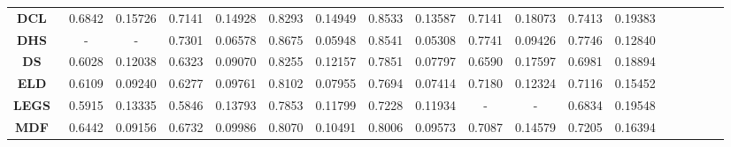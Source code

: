 \documentclass[10pt,twocolumn,letterpaper]{article}
\begin{document}
\begin{table*}
\begin{center}
\begin{tabular}{|c|c|c|c|c|c|c|c|c|c|c|c|c|c|c|c|c|c|c|c|c|c|c|c|c|||c|c|c|c|c|c|c|c|||}
\hline
\multicolumn{4}{|c|}{\textbf{DCL}~\cite{LiYu16}}
&\multicolumn{2}{|c|}{\textcolor[rgb]{1,0,0}{0.6842}}&\multicolumn{2}{|c|}{0.15726}&\multicolumn{2}{|c|}{0.7141}&\multicolumn{2}{|c|}{0.14928}&\multicolumn{2}{|c|}{0.8293}&\multicolumn{2}{|c|}{0.14949}&\multicolumn{2}{|c|}{0.8533}&\multicolumn{2}{|c|}{0.13587}&\multicolumn{2}{|c|}{0.7141}&\multicolumn{2}{|c|}{0.18073}&\multicolumn{2}{|c|}{0.7413}&\multicolumn{2}{|c|}{0.19383}\\
\multicolumn{4}{|c|}{\textbf{DHS}~\cite{liu2016dhsnet}}
&\multicolumn{2}{|c|}{-}&\multicolumn{2}{|c|}{-}&\multicolumn{2}{|c|}{\textcolor[rgb]{0,1,0}{0.7301}}&\multicolumn{2}{|c|}{\textcolor[rgb]{1,0,0}{0.06578}}&\multicolumn{2}{|c|}{0.8675}&\multicolumn{2}{|c|}{\textcolor[rgb]{0,1,0}{0.05948}}&\multicolumn{2}{|c|}{\textcolor[rgb]{0,1,0}{0.8541}}&\multicolumn{2}{|c|}{\textcolor[rgb]{0,1,0}{0.05308}}&\multicolumn{2}{|c|}{\textcolor[rgb]{1,0,0}{0.7741}}&\multicolumn{2}{|c|}{\textcolor[rgb]{1,0,0}{0.09426}}&\multicolumn{2}{|c|}{\textcolor[rgb]{1,0,0}{0.7746}}&\multicolumn{2}{|c|}{\textcolor[rgb]{1,0,0}{0.12840}}\\
\multicolumn{4}{|c|}{\textbf{DS}~\cite{Li2016DeepSaliency}}
&\multicolumn{2}{|c|}{0.6028}&\multicolumn{2}{|c|}{0.12038}&\multicolumn{2}{|c|}{0.6323}&\multicolumn{2}{|c|}{0.09070}&\multicolumn{2}{|c|}{0.8255}&\multicolumn{2}{|c|}{0.12157}&\multicolumn{2}{|c|}{0.7851}&\multicolumn{2}{|c|}{0.07797}&\multicolumn{2}{|c|}{0.6590}&\multicolumn{2}{|c|}{0.17597}&\multicolumn{2}{|c|}{0.6981}&\multicolumn{2}{|c|}{0.18894}\\
\multicolumn{4}{|c|}{\textbf{ELD}~\cite{lee2016deep}}
&\multicolumn{2}{|c|}{0.6109}&\multicolumn{2}{|c|}{\textcolor[rgb]{0,1,0}{0.09240}}&\multicolumn{2}{|c|}{0.6277}&\multicolumn{2}{|c|}{0.09761}&\multicolumn{2}{|c|}{0.8102}&\multicolumn{2}{|c|}{0.07955}&\multicolumn{2}{|c|}{0.7694}&\multicolumn{2}{|c|}{0.07414}&\multicolumn{2}{|c|}{0.7180}&\multicolumn{2}{|c|}{0.12324}&\multicolumn{2}{|c|}{0.7116}&\multicolumn{2}{|c|}{0.15452}\\
\multicolumn{4}{|c|}{\textbf{LEGS}~\cite{wang2015deep}}
&\multicolumn{2}{|c|}{0.5915}&\multicolumn{2}{|c|}{0.13335}&\multicolumn{2}{|c|}{0.5846}&\multicolumn{2}{|c|}{0.13793}&\multicolumn{2}{|c|}{0.7853}&\multicolumn{2}{|c|}{0.11799}&\multicolumn{2}{|c|}{0.7228}&\multicolumn{2}{|c|}{0.11934}&\multicolumn{2}{|c|}{-}&\multicolumn{2}{|c|}{-}&\multicolumn{2}{|c|}{0.6834}&\multicolumn{2}{|c|}{0.19548}\\
\multicolumn{4}{|c|}{\textbf{MDF}~\cite{zhao2015saliency}}
&\multicolumn{2}{|c|}{\textcolor[rgb]{0,0,1}{0.6442}}&\multicolumn{2}{|c|}{\textcolor[rgb]{1,0,0}{0.09156}}&\multicolumn{2}{|c|}{0.6732}&\multicolumn{2}{|c|}{0.09986}&\multicolumn{2}{|c|}{0.8070}&\multicolumn{2}{|c|}{0.10491}&\multicolumn{2}{|c|}{0.8006}&\multicolumn{2}{|c|}{0.09573}&\multicolumn{2}{|c|}{0.7087}&\multicolumn{2}{|c|}{0.14579}&\multicolumn{2}{|c|}{0.7205}&\multicolumn{2}{|c|}{0.16394}\\

\end{tabular}
\end{center}
\end{table*}
\end{document}
